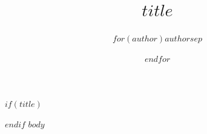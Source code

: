 \documentclass{article}
\title{$title$}
\author{$for(author)$$author$$sep$ \and $endfor$}
\begin{document}
$if(title)$
\maketitle
$endif$
$body$
\end{document}
